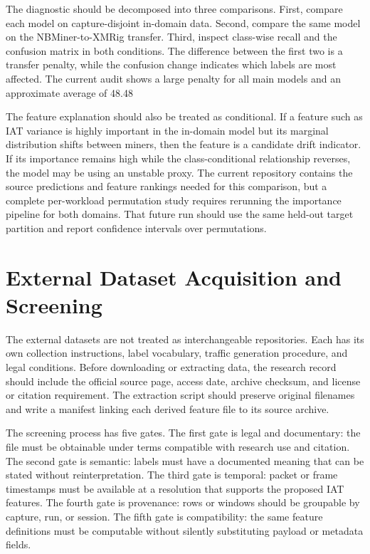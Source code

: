 \documentclass[conference]{IEEEtran}
\begin{document}
The diagnostic should be decomposed into three comparisons. First, compare each model on capture-disjoint in-domain data. Second, compare the same model on the NBMiner-to-XMRig transfer. Third, inspect class-wise recall and the confusion matrix in both conditions. The difference between the first two is a transfer penalty, while the confusion change indicates which labels are most affected. The current audit shows a large penalty for all main models and an approximate average of 48.48%

The feature explanation should also be treated as conditional. If a feature such as IAT variance is highly important in the in-domain model but its marginal distribution shifts between miners, then the feature is a candidate drift indicator. If its importance remains high while the class-conditional relationship reverses, the model may be using an unstable proxy. The current repository contains the source predictions and feature rankings needed for this comparison, but a complete per-workload permutation study requires rerunning the importance pipeline for both domains. That future run should use the same held-out target partition and report confidence intervals over permutations.

\section{External Dataset Acquisition and Screening}
The external datasets are not treated as interchangeable repositories. Each has its own collection instructions, label vocabulary, traffic generation procedure, and legal conditions. Before downloading or extracting data, the research record should include the official source page, access date, archive checksum, and license or citation requirement. The extraction script should preserve original filenames and write a manifest linking each derived feature file to its source archive.

The screening process has five gates. The first gate is legal and documentary: the file must be obtainable under terms compatible with research use and citation. The second gate is semantic: labels must have a documented meaning that can be stated without reinterpretation. The third gate is temporal: packet or frame timestamps must be available at a resolution that supports the proposed IAT features. The fourth gate is provenance: rows or windows should be groupable by capture, run, or session. The fifth gate is compatibility: the same feature definitions must be computable without silently substituting payload or metadata fields.
\end{document}
